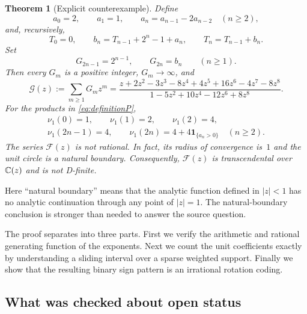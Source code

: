 \documentclass[11pt]{article}
\newtheorem{theorem}{Theorem}[section]
\theoremstyle{definition}\newtheorem{definition}[theorem]{Definition}
\theoremstyle{remark}\newtheorem{remark}[theorem]{Remark}
\newcommand{\ind}{\mathbf 1}
\newcommand{\nuone}{\nu_1}
\newcommand{\GF}{\mathcal G}
\newcommand{\F}{\mathcal F}
\begin{document}
\begin{theorem}[Explicit counterexample]\label{thm:main}
Define
\begin{equation}\label{eq:trace}
 a_0=2,\qquad a_1=1,\qquad a_n=a_{n-1}-2a_{n-2}\quad(n\geq2),
\end{equation}
and, recursively,
\begin{equation}\label{eq:mainexp}
 T_0=0,\qquad b_n=T_{n-1}+2^n-1+a_n,\qquad T_n=T_{n-1}+b_n.
\end{equation}
Set
\begin{equation}\label{eq:interleave}
 G_{2n-1}=2^{n-1},\qquad G_{2n}=b_n\qquad(n\geq1).
\end{equation}
Then every $G_m$ is a positive integer, $G_m\to\infty$, and
\begin{equation}\label{eq:Gfull}
 \GF(z):=\sum_{m\geq1}G_mz^m
 =\frac{z+2z^2-3z^3-8z^4+4z^5+16z^6-4z^7-8z^8}
 {1-5z^2+10z^4-12z^6+8z^8}.
\end{equation}
For the products in \eqref{eq:definitionP},
\begin{equation}\label{eq:exactcounts}
 \begin{gathered}
 \nuone(0)=1,\qquad \nuone(1)=2,\qquad \nuone(2)=4,\\
 \nuone(2n-1)=4,\qquad
 \nuone(2n)=4+4\ind_{\{a_n>0\}}\quad(n\geq2).
 \end{gathered}
\end{equation}
The series $\F(z)$ is not rational. In fact, its radius of convergence is~$1$ and the unit circle is a natural boundary. Consequently, $\F(z)$ is transcendental over $\mathbb C(z)$ and is not D-finite.
\end{theorem}

Here ``natural boundary'' means that the analytic function defined in $|z|<1$ has no analytic continuation through any point of $|z|=1$. The natural-boundary conclusion is stronger than needed to answer the source question.

The proof separates into three parts. First we verify the arithmetic and rational generating function of the exponents. Next we count the unit coefficients exactly by understanding a sliding interval over a sparse weighted support. Finally we show that the resulting binary sign pattern is an irrational rotation coding.

\subsection{What was checked about open status}
\end{document}

